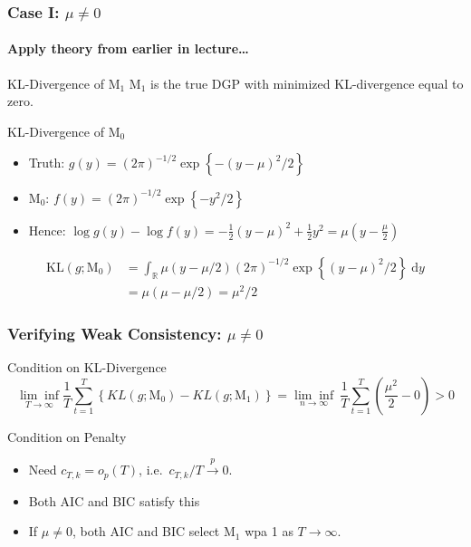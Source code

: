 \begin{frame}
  \frametitle{Case I: $\mu \neq 0$}
  \framesubtitle{Apply theory from earlier in lecture\dots}

  \begin{block}{KL-Divergence of $\text{M}_1$}
    $\text{M}_1$ is the true DGP with minimized KL-divergence equal to zero.
  \end{block}

  \pause

  \begin{block}{KL-Divergence of $\text{M}_0$}
    \begin{itemize}
      \item Truth: $g(y) = (2\pi)^{-1/2}\exp\left\{ -(y-\mu)^2/2 \right\}$  \pause
      \item $\text{M}_0$: $f(y) = (2\pi)^{-1/2}\exp\left\{ -y^2/2\right\}$ \pause
      \item Hence: $\log g(y) - \log f(y) = -\frac{1}{2}(y-\mu)^2 + \frac{1}{2}y^2 
          = \mu \left(y - \frac{\mu}{2}\right)$ \pause
    \end{itemize}

    \vspace{-1em}
          \begin{align*}
          \text{KL}(g;\text{M}_0) &= \int_{\mathbb{R}}\mu(y - \mu/2) (2\pi)^{-1/2}\exp\left\{ (y-\mu)^2/2 \right\}\; \text{d}y \\
          &= \mu(\mu - \mu/2) = \mu^2 /2
        \end{align*}
  \end{block}

\end{frame}
\begin{frame}
  \frametitle{Verifying Weak Consistency: $\mu \neq 0$}

  \begin{block}{Condition on KL-Divergence}
  \small
  \vspace{-2em}
  \[
    \underset{T\rightarrow \infty}{\lim\inf} \frac{1}{T}\sum_{t = 1}^T \left\{ KL(g; \text{M}_0) - KL(g;\text{M}_1) \right\} = \underset{n\rightarrow \infty}{\lim\inf}\ \frac{1}{T}\sum_{t = 1}^T  \left(\frac{\mu^2}{2} - 0\right) > 0
  \]
\end{block}

\pause

\begin{block}{Condition on Penalty}
  \begin{itemize}
    \item Need $c_{T,k} = o_p(T)$, i.e.\ $c_{T,k}/T \overset{p}{\rightarrow} 0$.  
    \item Both AIC and BIC satisfy this
    \item If $\mu \neq 0$, both AIC and BIC select $\text{M}_1$ wpa 1 as $T\rightarrow \infty$.
  \end{itemize}
\end{block}
\end{frame}
